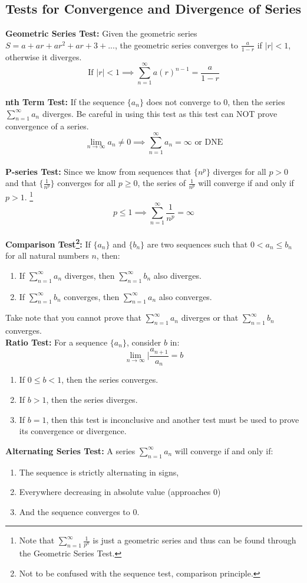 \documentclass[12pt, letterpaper]{article}
\begin{document}
\subsection{Tests for Convergence and Divergence of Series}
\textbf{Geometric Series Test:} Given the geometric series $S = a+ar+ar^2+ar+3+...$, the geometric series converges to $\frac{a}{1-r}$ if $|r|<1$, otherwise it diverges. \[\text{If } |r|<1\implies\sum_{n=1}^{\infty}a(r)^{n-1} = \frac{a}{1-r}\] \vspace{1em}\\
\textbf{nth Term Test:} If the sequence $\{a_n\}$ does not converge to 0, then the series $\sum_{n=1}^{\infty}a_n$ diverges. Be careful in using this test as this test can NOT prove convergence of a series. \[\lim_{n\rightarrow\infty}a_n\neq0 \implies \sum_{n=1}^{\infty}a_n=\infty \text{ or DNE}\] \vspace{1em}\\
\textbf{P-series Test:} Since we know from sequences that $\{n^p\}$ diverges for all $p>0$ and that $\{\frac{1}{n^p}\}$ converges for all $p\geq0$, the series of $\frac{1}{n^p}$ will converge if and only if $p>1$. \footnote{Note that $\sum_{n=1}^{\infty}\frac{1}{p^n}$ is just a geometric series and thus can be found through the Geometric Series Test.}\[p\leq1\implies\sum_{n=1}^{\infty}\frac{1}{n^p}=\infty\] \vspace{1em}\\
\textbf{Comparison Test\footnote{Not to be confused with the sequence test, comparison principle.}:} If $\{a_n\}$ and $\{b_n\}$ are two sequences such that $0<a_n\leq b_n$ for all natural numbers $n$, then:
\begin{enumerate}
    \item If $\sum_{n=1}^{\infty} a_n$ diverges, then $\sum_{n=1}^{\infty} b_n$ also diverges.
    \item If $\sum_{n=1}^{\infty} b_n$ converges, then $\sum_{n=1}^{\infty} a_n$ also converges.
\end{enumerate}
Take note that you cannot prove that $\sum_{n=1}^{\infty} a_n$ diverges or that $\sum_{n=1}^{\infty} b_n$ converges. \vspace{1em}\\
\textbf{Ratio Test:} For a sequence $\{a_n\}$, consider $b$ in: \[\lim_{n\rightarrow\infty}|\frac{a_{n+1}}{a_n}=b\]
\begin{enumerate}
    \item If $0\leq b<1$, then the series converges.
    \item If $b>1$, then the series diverges.
    \item If $b=1$, then this test is inconclusive and another test must be used to prove its convergence or divergence.
\end{enumerate} 
\textbf{Alternating Series Test:} A series $\sum_{n=1}^{\infty} a_n$ will converge if and only if:
\begin{enumerate}
    \item The sequence is strictly alternating in signs,
    \item Everywhere decreasing in absolute value (approaches 0)
    \item And the sequence converges to 0.
\end{enumerate}
\end{document}
